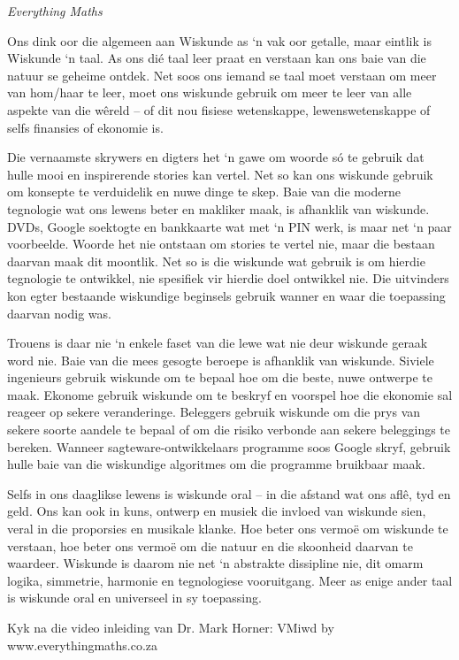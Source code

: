 \newpage
\thispagestyle{empty}

{\normalfont\sffamily\fontsize{22}\normalfont\itshape Everything Maths} \par

{
Ons dink oor die algemeen aan Wiskunde as ‘n vak oor getalle, maar eintlik is Wiskunde ‘n taal. As ons dié taal leer praat en verstaan kan ons baie van die natuur se geheime ontdek. Net soos ons iemand se taal moet verstaan om meer van hom/haar te leer, moet ons wiskunde gebruik om meer te leer van alle aspekte van die wêreld – of dit nou fisiese wetenskappe, lewenswetenskappe of selfs finansies of ekonomie is. \par

Die vernaamste skrywers en digters het ‘n gawe om woorde só te gebruik dat hulle mooi en inspirerende stories kan vertel. Net so kan ons wiskunde gebruik om konsepte te verduidelik en nuwe dinge te skep. Baie van die moderne tegnologie wat ons lewens beter en makliker maak, is afhanklik van wiskunde. DVDs, Google soektogte en bankkaarte wat met ‘n PIN werk, is maar net ‘n paar voorbeelde. Woorde het nie ontstaan om stories te vertel nie, maar die bestaan daarvan maak dit moontlik. Net so is die wiskunde wat gebruik is om hierdie tegnologie te ontwikkel, nie spesifiek vir hierdie doel ontwikkel nie. Die uitvinders kon egter bestaande wiskundige beginsels gebruik wanner en waar die toepassing daarvan nodig was. \par


Trouens is daar nie ‘n enkele faset van die lewe wat nie deur wiskunde geraak word nie. Baie van die mees gesogte beroepe is afhanklik van wiskunde. Siviele ingenieurs gebruik wiskunde om te bepaal hoe om die beste, nuwe ontwerpe te maak. Ekonome gebruik wiskunde om te beskryf en voorspel hoe die ekonomie sal reageer op sekere veranderinge. Beleggers gebruik wiskunde om die prys van sekere soorte aandele te bepaal of om die risiko verbonde aan sekere beleggings te bereken. Wanneer sagteware-ontwikkelaars programme soos Google skryf, gebruik hulle baie van die wiskundige algoritmes om die programme bruikbaar maak.\par

Selfs in ons daaglikse lewens is wiskunde oral – in die afstand wat ons aflê, tyd en geld. Ons kan ook in kuns, ontwerp en musiek die invloed van wiskunde sien, veral in die proporsies en musikale klanke. Hoe beter ons vermoë om wiskunde te verstaan, hoe beter ons vermoë om die natuur en die skoonheid daarvan te waardeer. Wiskunde is daarom nie net ‘n abstrakte dissipline nie, dit omarm logika, simmetrie, harmonie en tegnologiese vooruitgang. Meer as enige ander taal is wiskunde oral en universeel in sy toepassing. \par

Kyk na die video inleiding van Dr. Mark Horner:  VMiwd by www.everythingmaths.co.za

}





